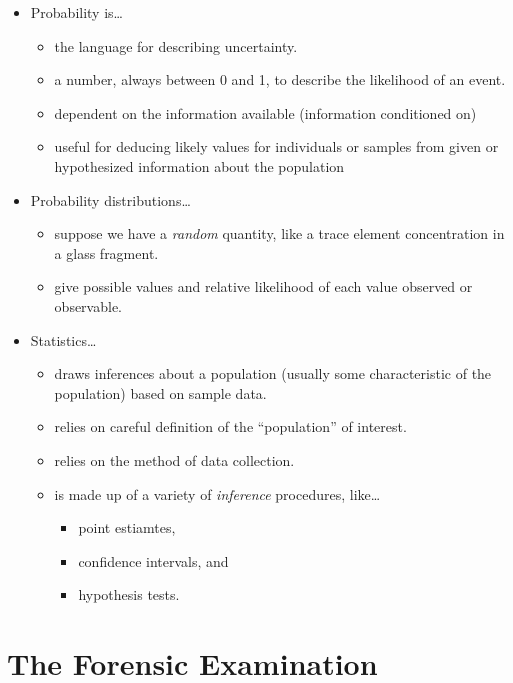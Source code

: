\documentclass[]{book}
\providecommand{\tightlist}{%
  \setlength{\itemsep}{0pt}\setlength{\parskip}{0pt}}
\theoremstyle{definition}
\theoremstyle{definition}
\theoremstyle{remark}
\begin{document}
\begin{itemize}
\tightlist
\item
  Probability is\ldots{}

  \begin{itemize}
  \tightlist
  \item
    the language for describing uncertainty.
  \item
    a number, always between 0 and 1, to describe the likelihood of an
    event.
  \item
    dependent on the information available (information conditioned on)
  \item
    useful for deducing likely values for individuals or samples from
    given or hypothesized information about the population
  \end{itemize}
\item
  Probability distributions\ldots{}

  \begin{itemize}
  \tightlist
  \item
    suppose we have a \emph{random} quantity, like a trace element
    concentration in a glass fragment.
  \item
    give possible values and relative likelihood of each value observed
    or observable.
  \end{itemize}
\item
  Statistics\ldots{}

  \begin{itemize}
  \tightlist
  \item
    draws inferences about a population (usually some characteristic of
    the population) based on sample data.
  \item
    relies on careful definition of the ``population'' of interest.
  \item
    relies on the method of data collection.
  \item
    is made up of a variety of \emph{inference} procedures, like\ldots{}

    \begin{itemize}
    \tightlist
    \item
      point estiamtes,
    \item
      confidence intervals, and
    \item
      hypothesis tests.
    \end{itemize}
  \end{itemize}
\end{itemize}

\section{The Forensic Examination}\label{the-forensic-examination}
\end{document}
